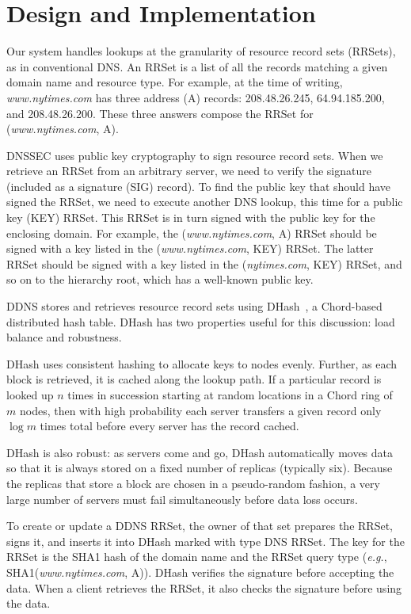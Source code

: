 \section{Design and Implementation}

Our system handles lookups at the granularity of resource record sets (RRSets),
as in conventional DNS.
An RRSet is a list of all the records matching a
given domain name and resource type.
For example, at the time of writing, {\em www.nytimes.com}
has three address (A) records: 208.48.26.245, 64.94.185.200,
and 208.48.26.200.  These three answers compose the RRSet
for ({\em www.nytimes.com}, A).

DNSSEC uses public key cryptography to sign resource record
sets.  When we retrieve an RRSet from an arbitrary
server, we need to verify the signature (included as a 
signature (SIG) record).
To find the public key that should have signed the RRSet,
we need to execute another DNS lookup, 
this time for a public key (KEY) RRSet.
This RRSet is in turn signed with the public key for the
enclosing domain.
For example, the ({\em www.nytimes.com}, A) RRSet should
be signed with a key listed in the ({\em www.nytimes.com}, KEY) RRSet.
The latter RRSet should be signed with a key
listed in the ({\em nytimes.com}, KEY)
RRSet, and so on to the hierarchy root,
which has a well-known public key.

DDNS stores and retrieves resource record sets using
DHash~\cite{cfs:sosp01}, a Chord-based distributed hash table.
DHash has two properties useful for this
discussion: load balance and robustness.

DHash uses consistent hashing to allocate keys to nodes evenly.
Further, as each block is retrieved, it is cached along
the lookup path.
If a particular record is looked up $n$ times in succession
starting at random locations in a Chord ring of $m$ nodes, 
then with high probability
each server transfers a given record only $\log{m}$ times total
before every server has the record cached.

DHash is also robust: as servers come and go, DHash automatically
moves data so that it is always stored on a fixed number of replicas
(typically six).  Because the replicas that store a block are chosen
in a pseudo-random fashion, a very large number of servers must
fail simultaneously before data loss occurs. 

To create or update a DDNS RRSet, the owner of that set prepares
the RRSet, signs it, and inserts it into DHash marked with type DNS RRSet.
The key for the RRSet is the SHA1 hash of the domain name and the RRSet query type
({\em e.g.}, SHA1({\em www.nytimes.com}, A)).
DHash verifies the signature before accepting the data.
When a client retrieves the RRSet, it also checks 
the signature before using the data.

